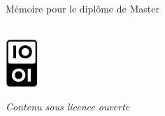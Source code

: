 \begin{titlepage}
\begin{center}
\begin{large}
Mémoire 
pour le diplôme de Master \\
\tnah \\

\bigskip

\includegraphics[width=1.25cm]{img/etalab-logo.png}

\begin{small}
{\textit{Contenu sous licence ouverte}}
\end{small}

\end{large}
\end{center}
\end{titlepage}